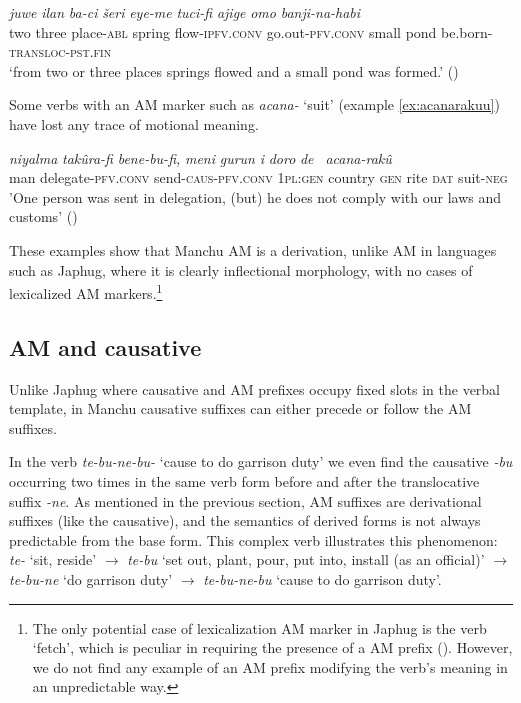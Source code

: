 \documentclass{article}
\newcommand{\ipa}[1]{\textit{{\phon\mbox{#1}}}} %
\begin{document}
\begin{exe}
\ex 
\gll
\ipa{juwe} 	\ipa{ilan} 	\ipa{ba-ci} 	\ipa{šeri} 	\ipa{eye-me} 	\ipa{tuci-fi} 	\ipa{ajige} 	\ipa{omo} 	\ipa{banji-na-habi} \\
two three place-\textsc{abl} spring flow-\textsc{ipfv.conv} go.out-\textsc{pfv.conv} small pond be.born-\textsc{transloc-pst.fin} \\
‘from two or three places springs flowed and a small pond was formed.’ (\citealt[68;14b]{shunjuu64tulishen})
\end{exe}

Some verbs with an AM marker such as \ipa{acana-} `suit' (example \ref{ex:acanarakuu}) have lost any trace of motional meaning.

\begin{exe}
\ex \label{ex:acanarakuu}
\gll
\ipa{niyalma} 	\ipa{takûra-fi} 	\ipa{bene-bu-fi,} 	\ipa{meni} 	\ipa{gurun} 	\ipa{i} 	\ipa{doro} 	\ipa{de } 	\ipa{acana-rakû} \\
man delegate-\textsc{pfv.conv} send-\textsc{caus}-\textsc{pfv.conv} \textsc{1pl:gen} country \textsc{gen} rite \textsc{dat} suit-\textsc{neg} \\
\glt  'One person was sent in delegation, (but) he does not comply with our laws and customs' (\citealt[112-113;79b]{shunjuu64tulishen})
\end{exe} 


These examples show that Manchu AM is a derivation, unlike AM in languages such as Japhug, where it is clearly inflectional morphology, with no cases of lexicalized AM markers.\footnote{The only potential case of lexicalization AM marker in Japhug is the verb `fetch', which is peculiar in requiring the presence of a AM prefix (\citealt[210]{jacques13harmonization}). However, we do not find any example of an AM prefix modifying the verb's meaning in an unpredictable way.}



\subsection{AM and causative} \label{sec:manchu.caus}

Unlike Japhug where causative and AM prefixes occupy fixed slots in the verbal template, in Manchu causative suffixes can either precede or follow the AM suffixes. 

In the verb \ipa{te-bu-ne-bu-} `cause to do garrison duty' we even find the causative \ipa{-bu} occurring two times in the same verb form before and after the translocative suffix \ipa{-ne}. As mentioned in the previous section, AM suffixes are derivational suffixes (like the causative), and the semantics of derived forms is not always predictable from the base form. This complex verb illustrates this phenomenon: \ipa{te-} `sit, reside' $\rightarrow$ \ipa{te-bu} `set out, plant, pour, put into, install (as an official)' $\rightarrow$ \ipa{te-bu-ne} `do garrison duty'
$\rightarrow$ \ipa{te-bu-ne-bu} `cause to do garrison duty'.
\end{document}

